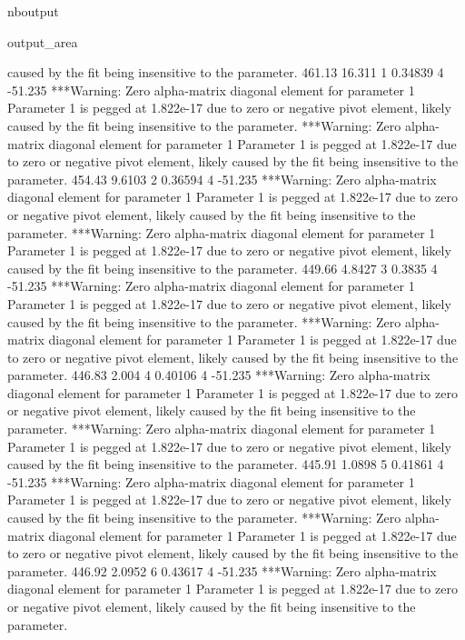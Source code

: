 \documentclass[letterpaper,10pt,english]{sphinxmanual}
\begin{document}
\begin{sphinxuseclass}{nboutput}
{\begin{sphinxuseclass}{output_area}
\begin{sphinxuseclass}{}
\begin{sphinxVerbatim}[commandchars=\\\{\}]
 caused by the fit being insensitive to the parameter.
          461.13      16.311    1     0.34839    4     -51.235
***Warning: Zero alpha-matrix diagonal element for parameter 1
 Parameter 1 is pegged at 1.822e-17 due to zero or negative pivot element, likely
 caused by the fit being insensitive to the parameter.
***Warning: Zero alpha-matrix diagonal element for parameter 1
 Parameter 1 is pegged at 1.822e-17 due to zero or negative pivot element, likely
 caused by the fit being insensitive to the parameter.
          454.43      9.6103    2     0.36594    4     -51.235
***Warning: Zero alpha-matrix diagonal element for parameter 1
 Parameter 1 is pegged at 1.822e-17 due to zero or negative pivot element, likely
 caused by the fit being insensitive to the parameter.
***Warning: Zero alpha-matrix diagonal element for parameter 1
 Parameter 1 is pegged at 1.822e-17 due to zero or negative pivot element, likely
 caused by the fit being insensitive to the parameter.
          449.66      4.8427    3      0.3835    4     -51.235
***Warning: Zero alpha-matrix diagonal element for parameter 1
 Parameter 1 is pegged at 1.822e-17 due to zero or negative pivot element, likely
 caused by the fit being insensitive to the parameter.
***Warning: Zero alpha-matrix diagonal element for parameter 1
 Parameter 1 is pegged at 1.822e-17 due to zero or negative pivot element, likely
 caused by the fit being insensitive to the parameter.
          446.83       2.004    4     0.40106    4     -51.235
***Warning: Zero alpha-matrix diagonal element for parameter 1
 Parameter 1 is pegged at 1.822e-17 due to zero or negative pivot element, likely
 caused by the fit being insensitive to the parameter.
***Warning: Zero alpha-matrix diagonal element for parameter 1
 Parameter 1 is pegged at 1.822e-17 due to zero or negative pivot element, likely
 caused by the fit being insensitive to the parameter.
          445.91      1.0898    5     0.41861    4     -51.235
***Warning: Zero alpha-matrix diagonal element for parameter 1
 Parameter 1 is pegged at 1.822e-17 due to zero or negative pivot element, likely
 caused by the fit being insensitive to the parameter.
***Warning: Zero alpha-matrix diagonal element for parameter 1
 Parameter 1 is pegged at 1.822e-17 due to zero or negative pivot element, likely
 caused by the fit being insensitive to the parameter.
          446.92      2.0952    6     0.43617    4     -51.235
***Warning: Zero alpha-matrix diagonal element for parameter 1
 Parameter 1 is pegged at 1.822e-17 due to zero or negative pivot element, likely
 caused by the fit being insensitive to the parameter.

\end{sphinxVerbatim}
\end{sphinxuseclass}
\end{sphinxuseclass}}
\end{sphinxuseclass}
\end{document}
